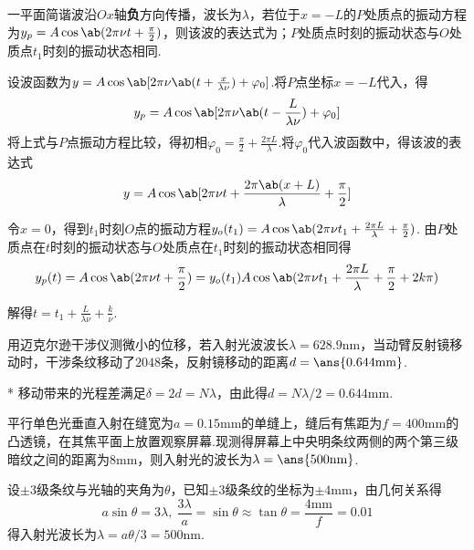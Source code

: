 \begin{problem}[平面简谐波的波函数][5]
    一平面简谐波沿$Ox$轴\textbf{\textcolor{H1}{负}}方向传播，波长为$\lambda$，若位于$x=-L$的$P$处质点的振动方程为$y_p=A\cos\ab(2\pi\nu t+\frac{\pi}{2})$，则该波的表达式为；$P$处质点时刻的振动状态与$O$处质点$t_1$时刻的振动状态相同.
\end{problem}
\begin{solution}
    设波函数为$y=A\cos\ab[2\pi\nu\ab(t+\frac{x}{\lambda\nu})+\varphi_0]$.将$P$点坐标$x=-L$代入，得
    \[y_p=A\cos\ab[2\pi\nu\ab(t-\frac{L}{\lambda\nu})+\varphi_0]\]
    \color{solutioncolor}
    将上式与$P$点振动方程比较，得初相$\varphi_0=\frac{\pi}{2}+\frac{2\pi L}{\lambda}$.将$\varphi_0$代入波函数中，得该波的表达式
    \[y=A\cos\ab[2\pi\nu t+\frac{2\pi\ab(x+L)}{\lambda}+\frac{\pi}{2}]\]

    令$x=0$，得到$t_1$时刻$O$点的振动方程$y_o(t_1)=A\cos\ab(2\pi\nu t_1+\frac{2\pi L}{\lambda}+\frac{\pi}{2})$. 由$P$处质点在$t$时刻的振动状态与$O$处质点在$t_1$时刻的振动状态相同得
    \[y_p(t)=A\cos\ab(2\pi\nu t+\frac{\pi}{2})=y_o(t_1)A\cos\ab(2\pi\nu t_1+\frac{2\pi L}{\lambda}+\frac{\pi}{2}+2k\pi)\]

    解得$t=t_1+\frac{L}{\lambda\nu}+\frac{k}{\nu}$.
\end{solution}

\begin{problem}[迈克尔逊干涉仪][3]
    用迈克尔逊干涉仪测微小的位移，若入射光波波长$\lambda=628.9\mathrm{nm}$，当动臂反射镜移动时，干涉条纹移动了$2048$条，反射镜移动的距离$d=\ans{0.644\mathrm{mm}}$.
\end{problem}
\begin{solution}*
    移动带来的光程差满足$\delta=2d=N\lambda$，由此得$d=N\lambda/2=0.644\mathrm{mm}$.
\end{solution}

\begin{problem}[弗琅禾费衍射][3]
    平行单色光垂直入射在缝宽为$a=0.15\mathrm{mm}$的单缝上，缝后有焦距为$f=400\mathrm{mm}$的凸透镜，在其焦平面上放置观察屏幕.现测得屏幕上中央明条纹两侧的两个第三级暗纹之间的距离为$8\mathrm{mm}$，则入射光的波长为$\lambda=\ans{500\mathrm{nm}}$.
\end{problem}
\begin{solution}
    设$\pm 3$级条纹与光轴的夹角为$\theta$，已知$\pm 3$级条纹的坐标为$\pm 4\mathrm{mm}$，由几何关系得
    \[a\sin\theta=3\lambda,\ \frac{3\lambda}{a}=\sin{\theta}\approx\tan\theta=\frac{4\mathrm{mm}}{f}=0.01\]
    得入射光波长为$\lambda=a\theta/3=500\mathrm{nm}$.
\end{solution}


